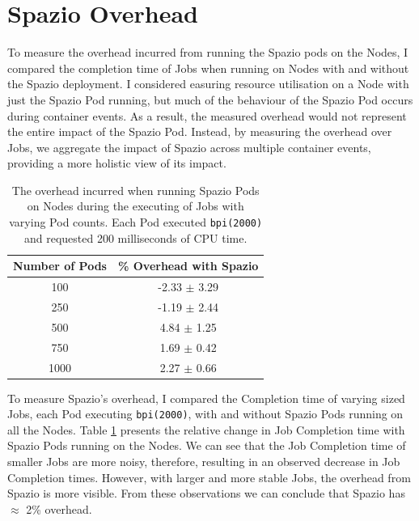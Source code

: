 \section{Spazio Overhead}
To measure the overhead incurred from running the Spazio pods on the Nodes, I
compared the completion time of Jobs when running on Nodes with and without the
Spazio deployment. I considered easuring resource utilisation on a Node with
just the Spazio Pod running, but much of the behaviour of the
Spazio Pod occurs during container events. As a result, the measured overhead
would not represent the entire impact of the Spazio Pod. Instead, by measuring
the overhead over Jobs, we aggregate the impact of Spazio across multiple
container events, providing a more holistic view of its impact.

\begin{table}[H]
\centering
    \begin{tabular}{|c|c|}
    \hline
    \textbf{Number of Pods} & \textbf{\% Overhead with Spazio} \\
    \hline
        100 & -2.33 $\pm$ 3.29 \\
        250 & -1.19 $\pm$ 2.44 \\
        500 & 4.84  $\pm$ 1.25 \\
        750 & 1.69  $\pm$ 0.42 \\
        1000 & 2.27  $\pm$ 0.66 \\
    \hline
    \end{tabular}
    \label{tab:overhead}
    \caption{The overhead incurred when running Spazio Pods on Nodes during the
    executing of Jobs with varying Pod counts. Each Pod executed
    \texttt{bpi(2000)} and requested 200 milliseconds of CPU time.}
\end{table}

To measure Spazio's overhead, I compared the Completion time of varying
sized Jobs, each Pod executing \texttt{bpi(2000)}, with and without Spazio Pods
running on all the Nodes. Table \ref{tab:overhead} presents the relative change
in Job Completion time with Spazio Pods running on the Nodes. We can see that
the Job Completion time of smaller Jobs are more noisy, therefore, resulting in
an observed decrease in Job Completion times. However, with larger and more
stable Jobs, the overhead from Spazio is more visible. From these observations
we can conclude that Spazio has $\approx$ 2\% overhead.
%
